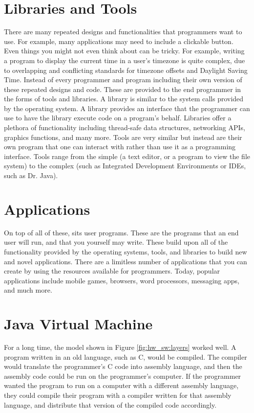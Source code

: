 \section{Libraries and Tools}
There are many repeated designs and functionalities that programmers
want to use. For example, many applications may need to include a clickable
button. Even things you might not even think about can be tricky. For example,
writing a program to display the current time in a user's timezone is quite complex,
due to overlapping and conflicting standards for timezone offsets and Daylight Saving Time.
Instead of every programmer and program including their own
version of these repeated designs and code. These are provided to the
end programmer in the forms of tools and libraries. A library is
similar to the system calls provided by the operating system. A library
provides an interface that the programmer can use to have the library
execute code on a program's behalf. Libraries offer a plethora of
functionality including thread-safe data structures, networking
APIs, graphics functions, and many more. Tools are very similar
but instead are their own program that one can interact with
rather than use it as a programming interface. Tools range
from the simple (a text editor, or a program to view the file system)
to the complex (such as Integrated Development Environments or IDEs, such as Dr. Java).

\section{Applications}
On top of all of these, sits user programs. These are the programs that
an end user will run, and that you yourself may write. These build upon
all of the functionality provided by the operating systems, tools,
and libraries to build new and novel applications. There are a limitless
number of applications that you can create by using the resources
available for programmers. Today, popular applications include mobile games,
browsers, word processors, messaging apps, and much more.

\section{Java Virtual Machine}

For a long time, the model shown in Figure \ref{fig:hw_sw:layers} worked well. A program written in an old language, such as C, would be compiled. The compiler would translate the programmer's C code into assembly language, and then the assembly code could be run on the programmer's computer. If the programmer wanted the program to run on a computer with a different assembly language, they could compile their program with a compiler written for that assembly language, and distribute that version of the compiled code accordingly.

